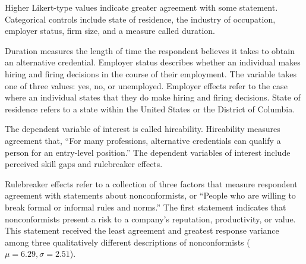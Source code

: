 \documentclass[review]{elsarticle}
\begin{document}
Higher Likert-type values indicate greater agreement with some statement.
Categorical controls include state of residence,
the industry of occupation,
employer status,
firm size,
and a measure called duration.

Duration measures the length of time the respondent believes it takes to obtain an alternative credential.
Employer status describes whether an individual makes hiring and firing decisions in the course of their employment.
The variable takes one of three values: yes, no, or unemployed.
Employer effects refer to the case where an individual states that they do make hiring and firing decisions.
State of residence refers to a state within the United States or the District of Columbia.

The dependent variable of interest is called hireability.
Hireability measures agreement that, ``For many professions, alternative credentials can qualify a person for an entry-level position.''
The dependent variables of interest include perceived skill gaps and rulebreaker effects.

Rulebreaker effects refer to a collection of three factors that measure respondent agreement with statements about nonconformists, or ``People who are willing to break formal or informal rules and norms.''
The first statement indicates that nonconformists present a risk to a company's reputation, productivity, or value.
This statement received the least agreement and greatest response variance
among three qualitatively different descriptions of nonconformists ($\mu = 6.29, \sigma = 2.51$).
\end{document}
